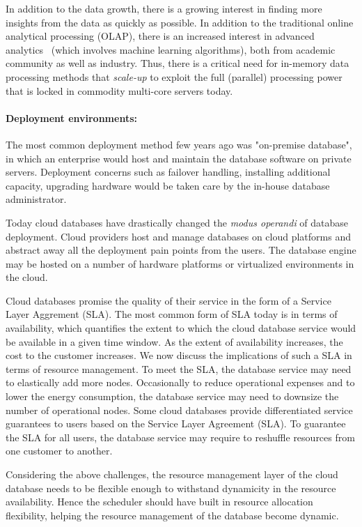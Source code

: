 In addition to the data growth, there is a growing interest in finding more insights from the data as quickly as possible.
In addition to the traditional online analytical processing (OLAP), there is an increased interest in advanced analytics~\cite{DBLP:conf/sigmod/Kumar0017} (which involves machine learning algorithms), both from academic community as well as industry. 
Thus, there is a critical need for in-memory data processing methods that \textit{scale-up} to exploit the full (parallel) processing power that is locked in commodity multi-core servers today.

\paragraph{Deployment environments:} 
The most common deployment method few years ago was "on-premise database", in which an enterprise would host and maintain the database software on private servers. 
Deployment concerns such as failover handling, installing additional capacity, upgrading hardware would be taken care by the in-house database administrator. 

Today cloud databases have drastically changed the \textit{modus operandi} of database deployment.
Cloud providers host and manage databases on cloud platforms and abstract away all the deployment pain points from the users.
The database engine may be hosted on a number of hardware platforms or virtualized environments in the cloud.

Cloud databases promise the quality of their service in the form of a Service Layer Aggrement (SLA).
The most common form of SLA today is in terms of availability, which quantifies the extent to which the cloud database service would be available in a given time window. 
As the extent of availability increases, the cost to the customer increases.
We now discuss the implications of such a SLA in terms of resource management.
To meet the SLA, the database service may need to elastically add more nodes. 
Occasionally to reduce operational expenses and to lower the energy consumption, the database service may need to downsize the number of operational nodes.
Some cloud databases provide differentiated service guarantees to users based on the Service Layer Agreement (SLA). 
To guarantee the SLA for all users, the database service may require to reshuffle resources from one customer to another. 

Considering the above challenges, the resource management layer of the cloud database needs to be flexible enough to withstand dynamicity in the resource availability.
Hence the scheduler should have built in resource allocation flexibility, helping the resource management of the database become dynamic.

